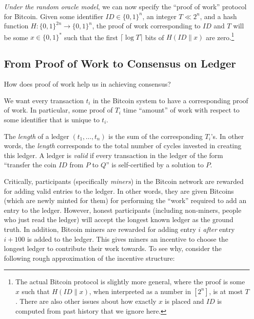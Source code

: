 \emph{Under the random oracle model}, we can now specify the ``proof of
work'' protocol for Bitcoin. Given some identifier
\(\ensuremath{\mathit{ID}}\in\{0,1\}^n\), an integer \(T \ll 2^n\), and
a hash function \(H:\{0,1\}^{2n}\rightarrow\{0,1\}^n\), the proof of
work corresponding to \(\ensuremath{\mathit{ID}}\) and \(T\) will be
some \(x\in\{0,1\}^*\) such that the first \(\lceil \log T \rceil\) bits
of \(H(\ensuremath{\mathit{ID}}\| x)\) are zero.\footnote{The actual
  Bitcoin protocol is slightly more general, where the proof is some
  \(x\) such that \(H(\ensuremath{\mathit{ID}}\|x)\), when interpreted
  as a number in \([2^n]\), is at most \(T\). There are also other
  issues about how exactly \(x\) is placed and
  \(\ensuremath{\mathit{ID}}\) is computed from past history that we
  ignore here.}

\subsection{From Proof of Work to Consensus on
Ledger}\label{7-From-Proof-of-Work-to-}

How does proof of work help us in achieving consensus?

We want every transaction \(t_i\) in the Bitcoin system to have a
corresponding proof of work. In particular, some proof of \(T_i\) time
``amount'' of work with respect to some identifier that is unique to
\(t_i\).

The \emph{length} of a ledger \((t_1,\ldots,t_n)\) is the sum of the
corresponding \(T_i\)'s. In other words, the \emph{length} corresponds
to the total number of cycles invested in creating this ledger. A ledger
is \emph{valid} if every transaction in the ledger of the form
``transfer the coin \(\ensuremath{\mathit{ID}}\) from \(P\) to \(Q\)''
is self-certified by a solution to \(P\).

Critically, participants (specifically \emph{miners}) in the Bitcoin
network are rewarded for adding valid entries to the ledger. In other
words, they are given Bitcoins (which are newly minted for them) for
performing the ``work'' required to add an entry to the ledger. However,
honest participants (including non-miners, people who just read the
ledger) will accept the longest known ledger as the ground truth. In
addition, Bitcoin miners are rewarded for adding entry \(i\)
\emph{after} entry \(i+100\) is added to the ledger. This gives miners
an incentive to choose the longest ledger to contribute their work
towards. To see why, consider the following rough approximation of the
incentive structure:

